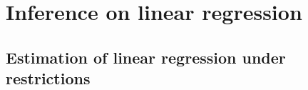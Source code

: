

\section{Inference on linear regression}

\subsection{Estimation of linear regression under restrictions}

